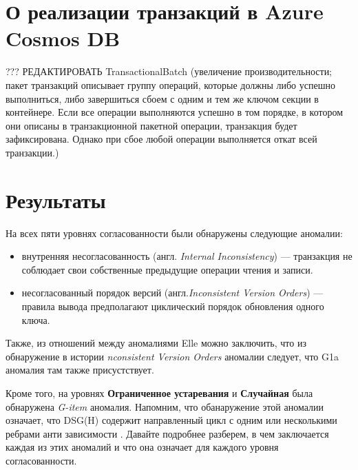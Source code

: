 \documentclass[12pt,  openany]{book}
\begin{document}
\section{О реализации транзакций в Azure Cosmos DB}
??? РЕДАКТИРОВАТЬ
TransactionalBatch (увеличение производительности; пакет транзакций описывает группу операций, которые должны либо успешно выполниться, либо завершиться сбоем с одним и тем же ключом секции в контейнере. Если все операции выполняются успешно в том порядке, в котором они описаны в транзакционной пакетной операции, транзакция будет зафиксирована. Однако при сбое любой операции выполняется откат всей транзакции.)
\section{Результаты}
На всех пяти уровнях согласованности были обнаружены следующие аномалии:
\begin{itemize}
\item внутренняя несогласованность (англ. \textit{Internal Inconsistency}) --- транзакция не соблюдает свои собственные предыдущие операции чтения и записи.
\item несогласованный порядок версий (англ.\textit{Inconsistent Version Orders}) --- правила вывода предполагают циклический порядок обновления одного ключа.
\end{itemize}

Также, из отношений между аномалиями Elle\cite{Kingsbury2020ElleII} можно заключить, что из обнаружение в истории  \textit{nconsistent Version Orders} аномалии следует, что G1a аномалия там также присустствует.
\par
Кроме того, на уровнях \textbf{Ограниченное устаревания} и \textbf{Случайная} была обнаружена \textit{G-item} аномалия. 
Напомним, что обанаружение этой аномалии означает, что DSG(H) содержит направленный цикл с одним или несколькими ребрами анти зависимости \cite{IsolationLevelDefinitions}.
Давайте подробнее разберем, в чем заключается каждая из этих аномалий и что она означает для каждого уровня согласованности.
\end{document}
